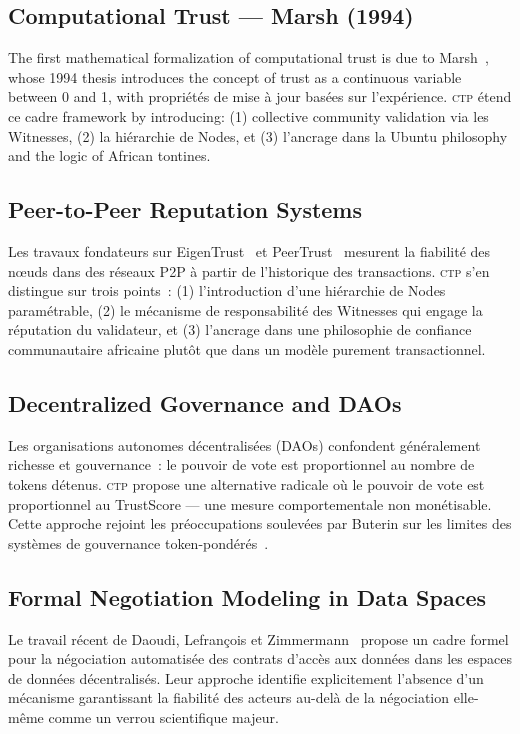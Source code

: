 \documentclass[12pt,a4paper]{article}
\theoremstyle{definition}
\theoremstyle{plain}
\theoremstyle{remark}
\newcommand{\CTP}{\textsc{ctp}}
\newcommand{\1}{\mathbf{1}}
\begin{document}
\subsection{Computational Trust --- Marsh (1994)}

The first mathematical formalization of computational trust is
due to Marsh~\cite{marsh1994trust}, whose 1994 thesis introduces
the concept of trust as a continuous variable between 0 and 1, with
propriétés de mise à jour basées sur l'expérience. \CTP{} étend ce cadre
framework by introducing: (1) collective community validation via
les Witnesses, (2) la hiérarchie de Nodes, et (3) l'ancrage dans la
Ubuntu philosophy and the logic of African tontines.

\subsection{Peer-to-Peer Reputation Systems}

Les travaux fondateurs sur EigenTrust~\cite{kamvar2003eigentrust}
et PeerTrust~\cite{xiong2004peertrust} mesurent la fiabilité
des nœuds dans des réseaux P2P à partir de l'historique des transactions.
\CTP{} s'en distingue sur trois points~: (1) l'introduction d'une
hiérarchie de Nodes paramétrable, (2) le mécanisme de responsabilité des
Witnesses qui engage la réputation du validateur, et (3) l'ancrage dans une
philosophie de confiance communautaire africaine plutôt que dans un modèle
purement transactionnel.

\subsection{Decentralized Governance and DAOs}

Les organisations autonomes décentralisées (DAOs) confondent généralement
richesse et gouvernance~: le pouvoir de vote est proportionnel au nombre de
tokens détenus. \CTP{} propose une alternative radicale où le pouvoir de vote
est proportionnel au TrustScore --- une mesure comportementale non monétisable.
Cette approche rejoint les préoccupations soulevées par Buterin sur les
limites des systèmes de gouvernance token-pondérés~\cite{buterin2021governance}.

\subsection{Formal Negotiation Modeling in Data Spaces}

Le travail récent de Daoudi, Lefrançois et Zimmermann~\cite{daoudi2026negotiation}
propose un cadre formel pour la négociation automatisée des contrats d'accès
aux données dans les espaces de données décentralisés. Leur approche identifie
explicitement l'absence d'un mécanisme garantissant la fiabilité des acteurs
au-delà de la négociation elle-même comme un verrou scientifique majeur.
\end{document}
